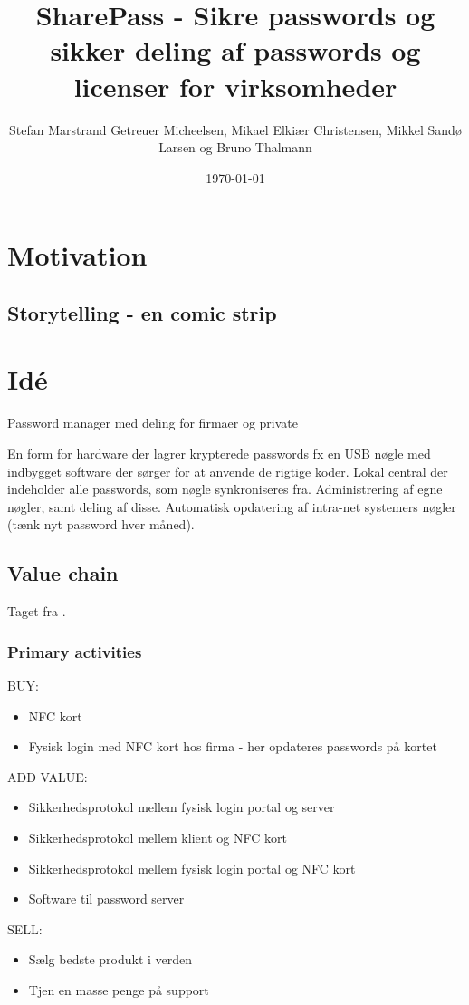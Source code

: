 \documentclass[a4paper]{article}
\title{SharePass - Sikre passwords og sikker deling af passwords og licenser for virksomheder}
\author{Stefan Marstrand Getreuer Micheelsen, Mikael Elkiær Christensen, Mikkel Sandø Larsen og Bruno Thalmann}
\date{\today}
\begin{document}
\maketitle

\section{Motivation}
\subsection{Storytelling - en comic strip}

\section{Idé}

Password manager med deling for firmaer og private

En form for hardware der lagrer krypterede passwords fx en USB nøgle med indbygget software der sørger for at anvende de rigtige koder.
Lokal central der indeholder alle passwords, som nøgle synkroniseres fra.
Administrering af egne nøgler, samt deling af disse.
Automatisk opdatering af intra-net systemers nøgler (tænk nyt password hver måned).

\subsection{Value chain}
Taget fra \citet[p.~12]{rose2012software}.
\subsubsection*{Primary activities}
BUY:
\begin{itemize}
\item NFC kort
\item Fysisk login med NFC kort hos firma - her opdateres passwords på kortet
\end{itemize}
ADD VALUE:
\begin{itemize}
\item Sikkerhedsprotokol mellem fysisk login portal og server
\item Sikkerhedsprotokol mellem klient og NFC kort
\item Sikkerhedsprotokol mellem fysisk login portal og NFC kort
\item Software til password server
\end{itemize}
SELL:
\begin{itemize}
\item Sælg bedste produkt i verden
\item Tjen en masse penge på support
\end{itemize}
\end{document}
